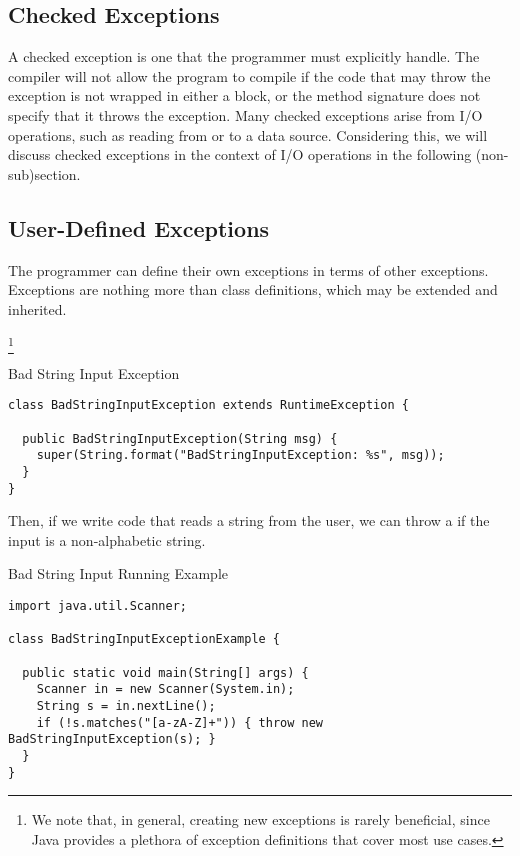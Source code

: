 \subsection*{Checked Exceptions}

A checked exception is one that the programmer must explicitly handle. The compiler will not allow the program to compile if the code that may throw the exception is not wrapped in either a  block, or the method signature does not specify that it throws the exception. Many checked exceptions arise from I/O operations, such as reading from or to a data source. Considering this, we will discuss checked exceptions in the context of I/O operations in the following (non-sub)section.

\subsection*{User-Defined Exceptions}
The programmer can define their own exceptions in terms of other exceptions. Exceptions are nothing more than class definitions, which may be extended and inherited. 

\footnote{We note that, in general, creating new exceptions is rarely beneficial, since Java provides a plethora of exception definitions that cover most use cases.}

\begin{cl}{Bad String Input Exception}
\begin{lstlisting}[language=MyJava]
class BadStringInputException extends RuntimeException {
  
  public BadStringInputException(String msg) {
    super(String.format("BadStringInputException: %s", msg));
  }
}
\end{lstlisting}
\end{cl}

Then, if we write code that reads a string from the user, we can throw a  if the input is a non-alphabetic string.

\begin{cl}{Bad String Input Running Example}
\begin{lstlisting}[language=MyJava]
import java.util.Scanner;

class BadStringInputExceptionExample {
  
  public static void main(String[] args) {
    Scanner in = new Scanner(System.in);
    String s = in.nextLine();
    if (!s.matches("[a-zA-Z]+")) { throw new BadStringInputException(s); }
  }
}
\end{lstlisting}
\end{cl}

